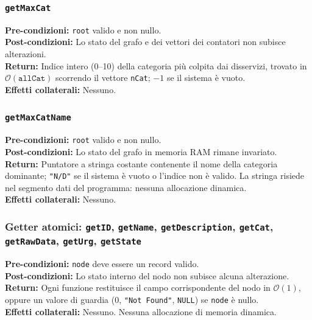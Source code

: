 \documentclass[12pt, a4paper]{article}
\begin{document}
\subsubsection{\texttt{getMaxCat}}
\vspace{3mm}
\begin{specbox}
\textbf{Pre-condizioni:} \texttt{root} valido e non nullo. \\
\textbf{Post-condizioni:} Lo stato del grafo e dei vettori dei contatori non subisce alterazioni. \\
\textbf{Return:} Indice intero (0--10) della categoria più colpita dai disservizi, trovato in $\mathcal{O}(\texttt{allCat})$ scorrendo il vettore \texttt{nCat}; $-1$ se il sistema è vuoto. \\
\textbf{Effetti collaterali:} Nessuno.
\end{specbox}

\newpage

\subsubsection{\texttt{getMaxCatName}}
\vspace{3mm}
\begin{specbox}
\textbf{Pre-condizioni:} \texttt{root} valido e non nullo. \\
\textbf{Post-condizioni:} Lo stato del grafo in memoria RAM rimane invariato. \\
\textbf{Return:} Puntatore a stringa costante contenente il nome della categoria dominante; \texttt{"N/D"} se il sistema è vuoto o l'indice non è valido. La stringa risiede nel segmento dati del programma: nessuna allocazione dinamica. \\
\textbf{Effetti collaterali:} Nessuno.
\end{specbox}

\subsubsection{Getter atomici: \texttt{getID}, \texttt{getName}, \texttt{getDescription}, \texttt{getCat}, \texttt{getRawData}, \texttt{getUrg}, \texttt{getState}}
\vspace{3mm}
\begin{specbox}
\textbf{Pre-condizioni:} \texttt{node} deve essere un record valido. \\
\textbf{Post-condizioni:} Lo stato interno del nodo non subisce alcuna alterazione. \\
\textbf{Return:} Ogni funzione restituisce il campo corrispondente del nodo in $\mathcal{O}(1)$, oppure un valore di guardia (0, \texttt{"Not Found"}, \texttt{NULL}) se \texttt{node} è nullo. \\
\textbf{Effetti collaterali:} Nessuno. Nessuna allocazione di memoria dinamica.
\end{specbox}
\end{document}
